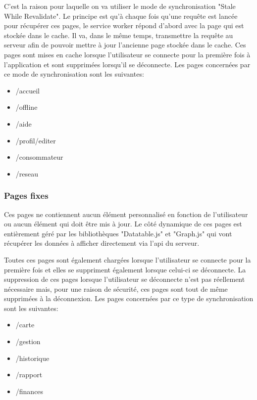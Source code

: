 \documentclass{EPL-master-thesis-covers-FR}
\begin{document}
				 	C'est la raison pour laquelle on va utiliser le mode de synchronisation "Stale While Revalidate". Le principe est qu'à chaque fois qu'une requête est lancée pour récupérer ces pages, le service worker répond d'abord avec la page qui est stockée dans le cache. Il va, dans le même temps, transmettre la requête au serveur afin de pouvoir mettre à jour l'ancienne page stockée dans le cache. Ces pages sont mises en cache lorsque l'utilisateur se connecte pour la première fois à l'application et sont supprimées lorsqu'il se déconnecte. Les pages concernées par ce mode de synchronisation sont les suivantes:
				 	\begin{itemize}
				 		\item /accueil
				 		\item /offline
				 		\item /aide
				 		\item /profil/editer
				 		\item /consommateur
				 		\item /reseau
				 	\end{itemize}
				 	
				 	
				\subsubsection*{Pages fixes} 
					Ces pages ne contiennent aucun élément personnalisé en fonction de l'utilisateur ou aucun élément qui doit être mis à jour. Le côté dynamique de ces pages est entièrement géré par les bibliothèques "Datatable.js" et "Graph.js" qui vont récupérer les données à afficher directement via l'\gls{api} du serveur. 
				
					Toutes ces pages sont également chargées lorsque l'utilisateur se connecte pour la première fois et elles se suppriment également lorsque celui-ci se déconnecte. La suppression de ces pages lorsque l'utilisateur se déconnecte n'est pas réellement nécessaire mais, pour une raison de sécurité, ces pages sont tout de même supprimées à la déconnexion. Les pages concernées par ce type de synchronisation sont les suivantes:
					\begin{itemize}
						\item /carte
						\item /gestion
						\item /historique
						\item /rapport
						\item /finances
					\end{itemize}					
				
\end{document}
